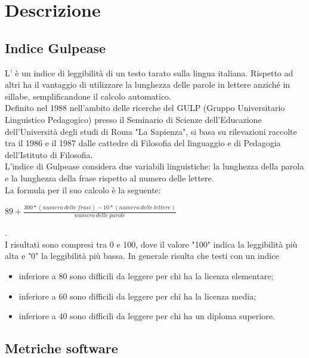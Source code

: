 \newpage
\section{Descrizione}%
\label{3}
\subsection{Indice Gulpease} %
\label{3.1}
L' è un indice di leggibilità di un testo tarato sulla lingua italiana. Rispetto ad altri ha il vantaggio di utilizzare la lunghezza delle parole in lettere anziché in sillabe, semplificandone il calcolo automatico.\\
Definito nel 1988 nell'ambito delle ricerche del GULP (Gruppo Universitario Linguistico Pedagogico) presso il Seminario di Scienze dell'Educazione dell'Università degli studi di Roma "La Sapienza", si basa su rilevazioni raccolte tra il 1986 e il 1987 dalle cattedre di Filosofia del linguaggio e di Pedagogia dell'Istituto di Filosofia.\\
L'indice di Gulpease considera due variabili linguistiche: la lunghezza della parola e la lunghezza della frase rispetto al numero delle lettere.\\
La formula per il suo calcolo è la seguente:
\\ 
\begin{center}
\begin{math}
 89+\frac{300*(numero\:delle\:frasi)-10*(numero\:delle\:lettere)}{numero\:delle\:parole} 
\end{math}
\end{center}
.\\
I risultati sono compresi tra 0 e 100, dove il valore "100" indica la leggibilità più alta e "0" la leggibilità più bassa. In generale risulta che testi con un indice
\begin{itemize}
\item inferiore a 80 sono difficili da leggere per chi ha la licenza elementare;
\item inferiore a 60 sono difficili da leggere per chi ha la licenza media;
\item inferiore a 40 sono difficili da leggere per chi ha un diploma superiore.
\end{itemize}

\subsection{Metriche software} %
